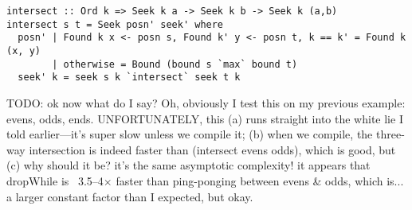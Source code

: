 \documentclass[acmsmall,screen,review,anonymous,dvipsnames,svgnames]{acmart}
\newcommand\todo[1]{{\color{Orange}#1}}
\renewcommand\todo[1]{{\color{IndianRed}#1}}
\begin{document}
\begin{verbatim}
intersect :: Ord k => Seek k a -> Seek k b -> Seek k (a,b)
intersect s t = Seek posn' seek' where
  posn' | Found k x <- posn s, Found k' y <- posn t, k == k' = Found k (x, y)
        | otherwise = Bound (bound s `max` bound t)
  seek' k = seek s k `intersect` seek t k
\end{verbatim}

\noindent
\todo{TODO: ok now what do I say? Oh, obviously I test this on my previous example: evens, odds, ends.
  UNFORTUNATELY, this (a) runs straight into the white lie I told earlier---it's super slow unless we compile it; (b) when we compile, the three-way intersection is indeed faster than (intersect evens odds), which is good, but (c) why should it be? it's the same asymptotic complexity! it appears that dropWhile is ~3.5--4$\times$ faster than ping-ponging between evens \& odds, which is... a larger constant factor than I expected, but okay.
}







\end{document}
